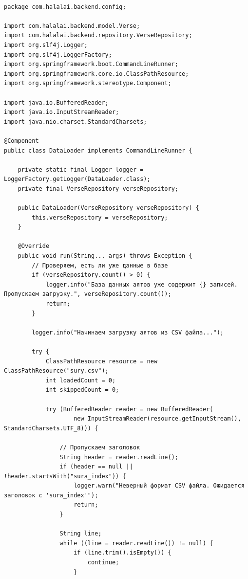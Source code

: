 \begin{lstlisting}[basicstyle=\tiny\ttfamily,breaklines=true]

package com.halalai.backend.config;

import com.halalai.backend.model.Verse;
import com.halalai.backend.repository.VerseRepository;
import org.slf4j.Logger;
import org.slf4j.LoggerFactory;
import org.springframework.boot.CommandLineRunner;
import org.springframework.core.io.ClassPathResource;
import org.springframework.stereotype.Component;

import java.io.BufferedReader;
import java.io.InputStreamReader;
import java.nio.charset.StandardCharsets;

@Component
public class DataLoader implements CommandLineRunner {

    private static final Logger logger = LoggerFactory.getLogger(DataLoader.class);
    private final VerseRepository verseRepository;

    public DataLoader(VerseRepository verseRepository) {
        this.verseRepository = verseRepository;
    }

    @Override
    public void run(String... args) throws Exception {
        // Проверяем, есть ли уже данные в базе
        if (verseRepository.count() > 0) {
            logger.info("База данных аятов уже содержит {} записей. Пропускаем загрузку.", verseRepository.count());
            return;
        }

        logger.info("Начинаем загрузку аятов из CSV файла...");
        
        try {
            ClassPathResource resource = new ClassPathResource("sury.csv");
            int loadedCount = 0;
            int skippedCount = 0;

            try (BufferedReader reader = new BufferedReader(
                    new InputStreamReader(resource.getInputStream(), StandardCharsets.UTF_8))) {
                
                // Пропускаем заголовок
                String header = reader.readLine();
                if (header == null || !header.startsWith("sura_index")) {
                    logger.warn("Неверный формат CSV файла. Ожидается заголовок с 'sura_index'");
                    return;
                }

                String line;
                while ((line = reader.readLine()) != null) {
                    if (line.trim().isEmpty()) {
                        continue;
                    }


\end{lstlisting}
